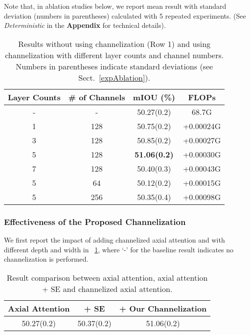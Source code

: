 \documentclass[letterpaper]{article} \usepackage{aaai22}  \usepackage{times}  \usepackage{helvet}  \usepackage{courier}  \usepackage[hyphens]{url}  \usepackage{graphicx} \urlstyle{rm} \def\UrlFont{\rm}  \usepackage{natbib}  \usepackage{caption} \DeclareCaptionStyle{ruled}{labelfont=normalfont,labelsep=colon,strut=off} \frenchspacing  \setlength{\pdfpagewidth}{8.5in}  \setlength{\pdfpageheight}{11in}  \usepackage{algorithm}
\begin{document}
Note that, in ablation studies below, we report mean result with standard deviation (numbers in parentheses) calculated with 5 repeated experiments. (See \textit{Deterministic} in the \textbf{Appendix} for technical details).
\begin{table}[t]
	\centering
	\small
	\begin{tabular}{c|c|c|c} 
		\toprule[1pt]
		\multicolumn{1}{c|}{Layer Counts} &\multicolumn{1}{c|}{\# of Channels} & mIOU (\%) & FLOPs \\
		\midrule[0.5pt]
		\midrule[0.5pt]
		-& -& 50.27(0.2)&  68.7G\\
		\midrule
		1&128& 50.75(0.2)& +0.00024G\\
		3&128& 50.85(0.2) & +0.00027G\\
		5&128& \textbf{51.06(0.2)} & +0.00030G \\
		7&128& 50.40(0.3)  & +0.00043G \\
		\midrule
		5&64& 50.12(0.2)& +0.00015G\\
		5&256 & 50.35(0.4) & +0.00098G \\
		\bottomrule[1pt]
	\end{tabular}
	\caption{ Results without using channelization (Row 1) and using channelization with different layer counts and channel numbers. Numbers in parentheses indicate standard deviations (see Sect.~\ref{expAblation}).}
	\label{table:cdp}
\end{table}







\subsubsection{Effectiveness of the Proposed Channelization}
We first report the impact of adding channelized axial attention and with different depth and width in \tablename{~\ref{table:cdp}}, where `-' for the baseline result indicates no channelization is performed. 



\begin{table}[t]
    \centering
    \small
    \begin{tabular}{c|c|c}
        \toprule[1pt]
        Axial Attention& + SE & + Our Channelization \\
        \midrule[0.5pt]
		\midrule[0.5pt]
        50.27(0.2) & 50.37(0.2)& 51.06(0.2) \\
        \bottomrule[1pt]
    \end{tabular}
     \caption{ Result comparison between axial attention, axial attention + SE and channelized axial attention.  }
    \label{table:sedesign}
\end{table}
\end{document}
